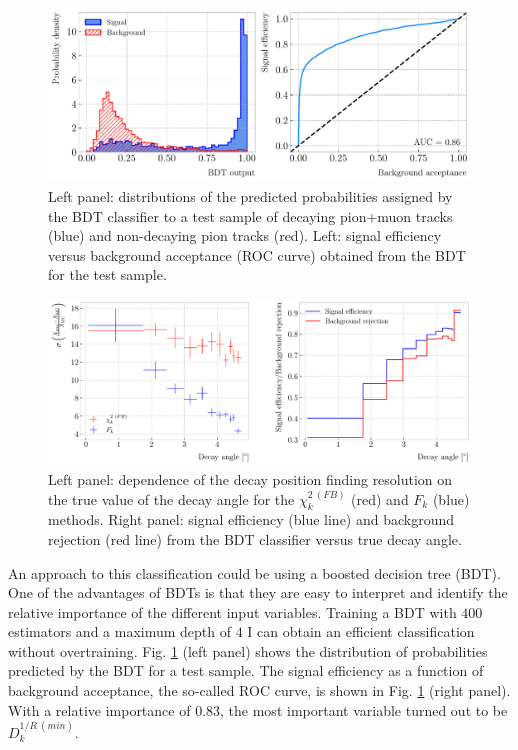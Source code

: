 \begin{figure}[t]
	\centering
	\includegraphics[width=.85\linewidth]{Images/GArSoft_PID/pion_decay/pion_decay_summary_bdt.pdf}
	\caption{Left panel: distributions of the predicted probabilities assigned by the BDT classifier to a test sample of decaying pion+muon tracks (blue) and non-decaying pion tracks (red). Left: signal efficiency versus background acceptance (ROC curve) obtained from the BDT for the test sample.}
	\label{fig:breakpoint_bdt}
\end{figure}

\begin{figure}[t]
	\centering
	\includegraphics[width=.85\linewidth]{Images/GArSoft_PID/pion_decay/pion_decay_angle_summary2.pdf}
	\caption{Left panel: dependence of the decay position finding resolution on the true value of the decay angle for the $\chi_{k}^{2 \ (FB)}$ (red) and $F_{k}$ (blue) methods. Right panel: signal efficiency (blue line) and background rejection (red line) from the BDT classifier versus true decay angle.}
	\label{fig:breakpoint_angle}
\end{figure}

An approach to this classification could be using a boosted decision tree (BDT). One of the advantages of BDTs is that they are easy to interpret and identify the relative importance of the different input variables. Training a BDT with $400$ estimators and a maximum depth of $4$ I can obtain an efficient classification without overtraining. Fig. \ref{fig:breakpoint_bdt} (left panel) shows the distribution of probabilities predicted by the BDT for a test sample. The signal efficiency as a function of background acceptance, the so-called ROC curve, is shown in Fig. \ref{fig:breakpoint_bdt} (right panel). With a relative importance of $0.83$, the most important variable turned out to be $D_{k}^{1/R \ (min)}$.

